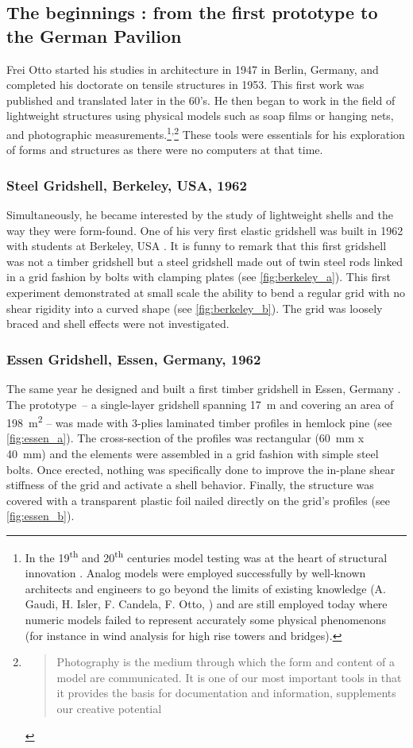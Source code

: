 \subsection{The beginnings : from the first prototype to the German Pavilion}
Frei Otto started his studies in architecture in 1947 in Berlin, Germany, and completed his doctorate on tensile structures in 1953. This first work was published and translated later in the 60's. He then began to work in the field of lightweight structures using physical models such as soap films or hanging nets, and photographic measurements.\footnote{In the 19\textsuperscript{th} and 20\textsuperscript{th} centuries model testing was at the heart of structural innovation \cite{Addis2013}. Analog models were employed successfully by well-known architects and engineers to go beyond the limits of existing knowledge (A. Gaudi, H. Isler, F. Candela, F. Otto, \telp{}) and are still employed today where numeric models failed to represent accurately some physical phenomenons (for instance in wind analysis for high rise towers and bridges).}\textsuperscript{,}\footnote{\blockcquote[p.~56]{IL10}{Photography is the medium through which the form and content of a model are communicated. It is one of our most important tools in that it provides the basis for documentation and information, supplements our creative potential \belp{} }} These tools were essentials for his exploration of forms and structures as there were no computers at that time.

\subsubsection{Steel Gridshell, Berkeley, USA, 1962}
Simultaneously, he became interested by the study of lightweight shells and the way they were form-found. One of his very first elastic gridshell was built in 1962 with students at Berkeley, USA \cite[p.~270]{IL10}. It is funny to remark that this first gridshell was not a timber gridshell but a steel gridshell made out of twin steel rods linked in a grid fashion by bolts with clamping plates (see \cref{fig:berkeley_a}). This first experiment demonstrated at small scale the ability to bend a regular grid with no shear rigidity into a curved shape  (see \cref{fig:berkeley_b}). The grid was loosely braced and shell effects were not investigated.

\subsubsection{Essen Gridshell, Essen, Germany, 1962}
The same year he designed and built a first timber gridshell in Essen, Germany \cite[p.~272]{IL10}. The prototype~-- a single-layer gridshell spanning \SI{17}{m} and covering an area of \SI{198}{m^2} -- was made with 3-plies laminated timber profiles in hemlock pine (see \cref{fig:essen_a}). The cross-section of the profiles was rectangular (\SI{60}{mm} x \SI{40}{mm}) and the elements were assembled in a grid fashion with simple steel bolts. Once erected, nothing was specifically done to improve the in-plane shear stiffness of the grid and activate a shell behavior. Finally, the structure was covered with a transparent plastic foil nailed directly on the grid's profiles (see \cref{fig:essen_b}).

